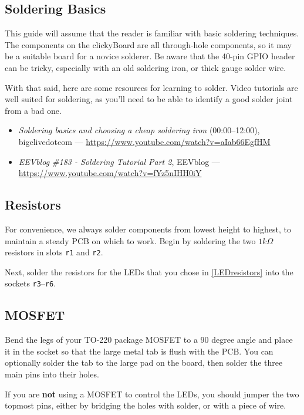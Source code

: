 \documentclass[10pt, a4paper, onesided]{article}
\begin{document}
	\subsection*{Soldering Basics}
		This guide will assume that the reader is familiar with basic soldering techniques. The components on the clickyBoard are all through-hole components, so it may be a suitable board for a novice solderer. Be aware that the 40-pin GPIO header can be tricky, especially with an old soldering iron, or thick gauge solder wire.
		
		With that said, here are some resources for learning to solder. Video tutorials are well suited for soldering, as you'll need to be able to identify a good solder joint from a bad one.
		\begin{itemize}[nolistsep]
			\item \textit{Soldering basics and choosing a cheap soldering iron} (00:00--12:00), bigclivedotcom --- \url{https://www.youtube.com/watch?v=aIab66EgfHM}
			\item \textit{EEVblog \#183 - Soldering Tutorial Part 2}, EEVblog --- \url{https://www.youtube.com/watch?v=fYz5nIHH0iY}
		\end{itemize}
	
	\subsection*{Resistors}
	
		For convenience, we always solder components from lowest height to highest, to maintain a steady PCB on which to work. Begin by soldering the two $1 k\Omega$ resistors in slots \texttt{r1} and \texttt{r2}.
		
		Next, solder the resistors for the LEDs that you chose in \autoref{LEDresistors} into the sockets \texttt{r3}--\texttt{r6}.
	
	\subsection*{MOSFET}
	
		Bend the legs of your TO-220 package MOSFET to a 90 degree angle and place it in the socket so that the large metal tab is flush with the PCB. You can optionally solder the tab to the large pad on the board, then solder the three main pins into their holes.
		
		If you are \textbf{not} using a MOSFET to control the LEDs, you should jumper the two topmost pins, either by bridging the holes with solder, or with a piece of wire.
	
\end{document}
